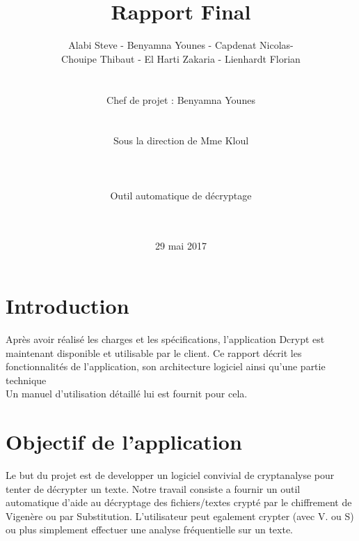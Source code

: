 \documentclass[a4]{article}
\begin{document}
	\title{\Huge{\textbf{Rapport Final}}}
	\author{Alabi Steve - Benyamna Younes - Capdenat Nicolas- \\
		Chouipe Thibaut - El Harti Zakaria - Lienhardt Florian \\ \\ \\
		Chef de projet : Benyamna Younes \\ \\ \\ 
		Sous la direction de Mme Kloul \\ \\ \\ \\
		Outil automatique de décryptage \\ \\ \\}
	\date{29 mai 2017}
		

	\begin{titlepage}
		\maketitle
		\vspace{20em}
	\end{titlepage}
	\section{Introduction}
Après avoir réalisé les charges et les spécifications, l'application Dcrypt est maintenant disponible et utilisable par le client. Ce rapport décrit les fonctionnalités de l'application, son architecture logiciel ainsi qu'une partie technique \\
Un manuel d'utilisation détaillé lui est fournit pour cela.
	\section{Objectif de l'application}
	Le but du projet est de developper un logiciel convivial de cryptanalyse pour tenter de décrypter un texte. Notre travail consiste a fournir un outil automatique d'aide au décryptage des fichiers/textes crypté par le chiffrement de Vigenère ou par  Substitution. L'utilisateur peut egalement crypter (avec V. ou S) ou plus simplement effectuer une analyse fréquentielle sur un texte.
\end{document}

